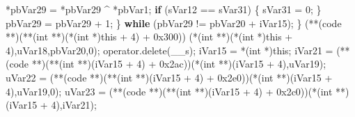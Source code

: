 \documentclass[
]{article}
\newenvironment{Shaded}{}{}
\newcommand{\BaseNTok}[1]{\textcolor[rgb]{0.25,0.63,0.44}{#1}}
\newcommand{\ControlFlowTok}[1]{\textcolor[rgb]{0.00,0.44,0.13}{\textbf{#1}}}
\newcommand{\DataTypeTok}[1]{\textcolor[rgb]{0.56,0.13,0.00}{#1}}
\newcommand{\DecValTok}[1]{\textcolor[rgb]{0.25,0.63,0.44}{#1}}
\newcommand{\NormalTok}[1]{#1}
\newcommand{\OperatorTok}[1]{\textcolor[rgb]{0.40,0.40,0.40}{#1}}
\begin{document}
\begin{Shaded}
\begin{Highlighting}[]
          \OperatorTok{*}\NormalTok{pbVar29 }\OperatorTok{=} \OperatorTok{*}\NormalTok{pbVar29 }\OperatorTok{\^{}} \OperatorTok{*}\NormalTok{pbVar1}\OperatorTok{;}
          \ControlFlowTok{if} \OperatorTok{(}\NormalTok{sVar12 }\OperatorTok{==}\NormalTok{ sVar31}\OperatorTok{)} \OperatorTok{\{}
\NormalTok{            sVar31 }\OperatorTok{=} \DecValTok{0}\OperatorTok{;}
          \OperatorTok{\}}
\NormalTok{          pbVar29 }\OperatorTok{=}\NormalTok{ pbVar29 }\OperatorTok{+} \DecValTok{1}\OperatorTok{;}
        \OperatorTok{\}} \ControlFlowTok{while} \OperatorTok{(}\NormalTok{pbVar29 }\OperatorTok{!=}\NormalTok{ pbVar20 }\OperatorTok{+}\NormalTok{ iVar15}\OperatorTok{);}
      \OperatorTok{\}}
      \OperatorTok{(**(}\NormalTok{code }\OperatorTok{**)(**(}\DataTypeTok{int} \OperatorTok{**)(*(}\DataTypeTok{int} \OperatorTok{*)}\NormalTok{this }\OperatorTok{+} \DecValTok{4}\OperatorTok{)} \OperatorTok{+} \BaseNTok{0x300}\OperatorTok{))}
                \OperatorTok{(*(}\DataTypeTok{int} \OperatorTok{**)(*(}\DataTypeTok{int} \OperatorTok{*)}\NormalTok{this }\OperatorTok{+} \DecValTok{4}\OperatorTok{),}\NormalTok{uVar18}\OperatorTok{,}\NormalTok{pbVar20}\OperatorTok{,}\DecValTok{0}\OperatorTok{);}
\NormalTok{      operator}\OperatorTok{.}\NormalTok{delete}\OperatorTok{(}\NormalTok{\_\_s}\OperatorTok{);}
\NormalTok{      iVar15 }\OperatorTok{=} \OperatorTok{*(}\DataTypeTok{int} \OperatorTok{*)}\NormalTok{this}\OperatorTok{;}
\NormalTok{      iVar21 }\OperatorTok{=} \OperatorTok{(**(}\NormalTok{code }\OperatorTok{**)(**(}\DataTypeTok{int} \OperatorTok{**)(}\NormalTok{iVar15 }\OperatorTok{+} \DecValTok{4}\OperatorTok{)} \OperatorTok{+} \BaseNTok{0x2ac}\OperatorTok{))(*(}\DataTypeTok{int} \OperatorTok{**)(}\NormalTok{iVar15 }\OperatorTok{+} \DecValTok{4}\OperatorTok{),}\NormalTok{uVar19}\OperatorTok{);}
\NormalTok{      uVar22 }\OperatorTok{=} \OperatorTok{(**(}\NormalTok{code }\OperatorTok{**)(**(}\DataTypeTok{int} \OperatorTok{**)(}\NormalTok{iVar15 }\OperatorTok{+} \DecValTok{4}\OperatorTok{)} \OperatorTok{+} \BaseNTok{0x2e0}\OperatorTok{))(*(}\DataTypeTok{int} \OperatorTok{**)(}\NormalTok{iVar15 }\OperatorTok{+} \DecValTok{4}\OperatorTok{),}\NormalTok{uVar19}\OperatorTok{,}\DecValTok{0}\OperatorTok{);}
\NormalTok{      uVar23 }\OperatorTok{=} \OperatorTok{(**(}\NormalTok{code }\OperatorTok{**)(**(}\DataTypeTok{int} \OperatorTok{**)(}\NormalTok{iVar15 }\OperatorTok{+} \DecValTok{4}\OperatorTok{)} \OperatorTok{+} \BaseNTok{0x2c0}\OperatorTok{))(*(}\DataTypeTok{int} \OperatorTok{**)(}\NormalTok{iVar15 }\OperatorTok{+} \DecValTok{4}\OperatorTok{),}\NormalTok{iVar21}\OperatorTok{);}

\end{Highlighting}
\end{Shaded}
\end{document}
